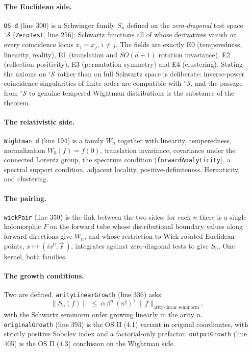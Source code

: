 \documentclass[11pt,a4paper]{article}
\newcommand{\lean}[1]{\texttt{#1}}
\begin{document}
\paragraph{The Euclidean side.}
\lean{OS d} (line 300) is a Schwinger family
$S_n$ defined on the \emph{zero-diagonal} test space $^{\circ}\mathcal{S}$
(\lean{ZeroTest}, line 256): Schwartz functions all of whose derivatives vanish on
every coincidence locus $x_i = x_j$, $i \ne j$. The fields are exactly
E0 (temperedness, linearity, reality), E1 (translation and $SO(d+1)$ rotation
invariance), E2 (reflection positivity), E3 (permutation symmetry) and
E4 (clustering). Stating the axioms on $^{\circ}\mathcal{S}$ rather than on full
Schwartz space is deliberate: inverse-power coincidence singularities of finite
order are compatible with $^{\circ}\mathcal{S}$, and the passage from
$^{\circ}\mathcal{S}$ to genuine tempered Wightman distributions is the
substance of the theorem.

\paragraph{The relativistic side.}
\lean{Wightman d} (line 194) is a family $W_n$ together with linearity,
temperedness, normalization $W_0(f) = f(0)$, translation invariance, covariance
under the connected Lorentz group, the spectrum condition
(\lean{forwardAnalyticity}), a spectral support condition, adjacent locality,
positive-definiteness, Hermiticity, and clustering.

\paragraph{The pairing.}
\lean{wickPair} (line 350) is the link between the two sides: for each $n$ there is
a single holomorphic $F$ on the forward tube whose distributional boundary values
along forward directions give $W_n$, and whose restriction to Wick-rotated
Euclidean points, $x \mapsto (ix^0, \vec{x}\,)$, integrates against
zero-diagonal tests to give $S_n$. One kernel, both families.

\paragraph{The growth conditions.}
Two are defined. \lean{arityLinearGrowth} (line 336) asks
\[
  \|S_n(f)\| \;\le\; \alpha\,\beta^{n}\,(n!)^{\gamma}\;
  \|f\|_{\text{arity-linear seminorm}},
\]
with the Schwartz seminorm order growing linearly in the arity $n$.
\lean{originalGrowth} (line 393) is the OS II (4.1) variant in original
coordinates, with strictly positive Sobolev index and a factorial-only prefactor.
\lean{outputGrowth} (line 405) is the OS II (4.3) conclusion on the Wightman side.
\end{document}
